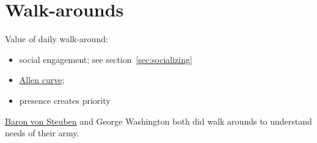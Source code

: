 \section{Walk-arounds}

Value of daily walk-around: 
\begin{itemize}
    \item social engagement; see section~\ref{sec:socializing}
\item \href{https://en.wikipedia.org/wiki/Allen_curve}{Allen curve}; 
\item presence creates priority
\end{itemize}

\href{https://en.wikipedia.org/wiki/Friedrich_Wilhelm_von_Steuben}{Baron von Steuben} and George Washington both did walk arounds to understand needs of their army. 